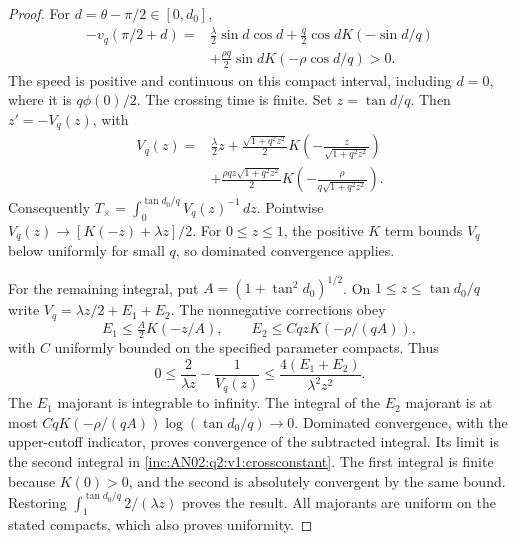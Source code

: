 \documentclass[11pt]{article}
\numberwithin{equation}{section}
\theoremstyle{remark}\newtheorem{remark}[theorem]{Remark}
\newcommand{\dd}{\,d}\newcommand{\E}{\mathbb E}\newcommand{\R}{\mathbb R}
\begin{document}
\begin{proof}
For $d=\theta-\pi/2\in[0,d_0]$,
\begin{align*}
 -v_q(\pi/2+d)
 ={}&\frac\lambda2\sin d\cos d
 +\frac q2\cos d K(-\sin d/q)\\
 &+\frac{\rho q}{2}\sin d K(-\rho\cos d/q)>0.
\end{align*}
The speed is positive and continuous on this compact interval, including
$d=0$, where it is $q\phi(0)/2$. The crossing time is finite.
Set $z=\tan d/q$. Then $z'=-V_q(z)$, with
\begin{align*}
 V_q(z)={}&\frac\lambda2z
 +\frac{\sqrt{1+q^2z^2}}2
       K\left(-\frac{z}{\sqrt{1+q^2z^2}}\right)\\
 &+\frac{\rho qz\sqrt{1+q^2z^2}}2
       K\left(-\frac{\rho}{q\sqrt{1+q^2z^2}}\right).
\end{align*}
Consequently $T_\times=\int_0^{\tan d_0/q}V_q(z)^{-1}\dd z$.
Pointwise $V_q(z)\to[K(-z)+\lambda z]/2$.
For $0\le z\le1$, the positive $K$ term bounds $V_q$ below uniformly
for small $q$, so dominated convergence applies.

For the remaining integral, put $A=(1+\tan^2d_0)^{1/2}$.
On $1\le z\le\tan d_0/q$ write $V_q=\lambda z/2+E_1+E_2$.
The nonnegative corrections obey
\[
 E_1\le\tfrac A2K(-z/A),\qquad
 E_2\le CqzK(-\rho/(qA)),
\]
with $C$ uniformly bounded on the specified parameter compacts. Thus
\[
 0\le\frac2{\lambda z}-\frac1{V_q(z)}
 \le\frac{4(E_1+E_2)}{\lambda^2z^2}.
\]
The $E_1$ majorant is integrable to infinity. The integral of the
$E_2$ majorant is at most
$CqK(-\rho/(qA))\log(\tan d_0/q)\to0$.
Dominated convergence, with the upper-cutoff indicator, proves convergence
of the subtracted integral. Its limit is the second integral in
\eqref{inc:AN02:q2:v1:crossconstant}. The first integral is finite
because $K(0)>0$, and the second is absolutely convergent by the same
bound. Restoring $\int_1^{\tan d_0/q}2/(\lambda z)$ proves the result.
All majorants are uniform on the stated compacts, which also proves
uniformity.
\end{proof}
\end{document}
